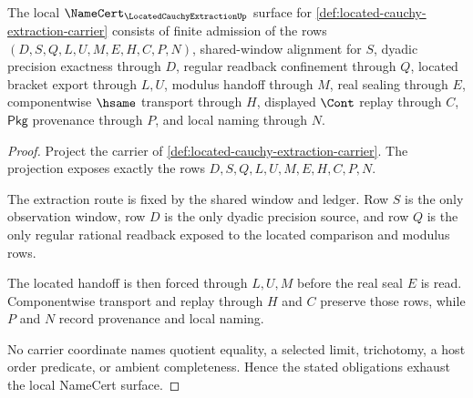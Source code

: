\begin{theorem}
\label{thm:located-cauchy-extraction-namecert-obligations}
The local $\NameCert_{\LocatedCauchyExtractionUp}$ surface for
\autoref{def:located-cauchy-extraction-carrier} consists of finite admission of
the rows $(D,S,Q,L,U,M,E,H,C,P,N)$, shared-window alignment for $S$, dyadic
precision exactness through $D$, regular readback confinement through $Q$,
located bracket export through $L,U$, modulus handoff through $M$, real sealing
through $E$, componentwise $\hsame$ transport through $H$, displayed $\Cont$
replay through $C$, $\mathsf{Pkg}$ provenance through $P$, and local naming
through $N$.
\end{theorem}
\begin{proof}
Project the carrier of
\autoref{def:located-cauchy-extraction-carrier}. The projection exposes exactly
the rows $D,S,Q,L,U,M,E,H,C,P,N$.

The extraction route is fixed by the shared window and ledger. Row $S$ is the
only observation window, row $D$ is the only dyadic precision source, and row
$Q$ is the only regular rational readback exposed to the located comparison and
modulus rows.

The located handoff is then forced through $L,U,M$ before the real seal $E$ is
read. Componentwise transport and replay through $H$ and $C$ preserve those
rows, while $P$ and $N$ record provenance and local naming.

No carrier coordinate names quotient equality, a selected limit, trichotomy, a
host order predicate, or ambient completeness. Hence the stated obligations
exhaust the local NameCert surface.
\end{proof}

